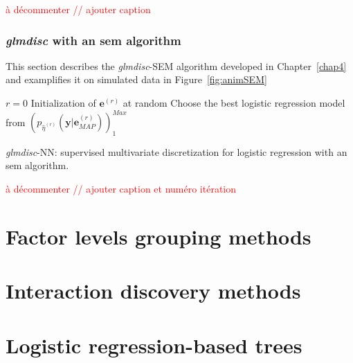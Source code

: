 \textcolor{red}{à décommenter // ajouter caption}

\subsubsection{\textit{glmdisc} with an \gls{sem} algorithm}

This section describes the \textit{glmdisc}-SEM algorithm developed in Chapter~\ref{chap4} and examplifies it on simulated data in Figure~\ref{fig:animSEM}

\begin{algorithm}[H]
 $r = 0$\;
 Initialization of $\bm{e}^{(r)}$ at random\;
 Choose the best logistic regression model from $(p_{\hat{\eta}^{(r)}}(\bm{y} | \bm{e}_{MAP}^{(r)}))_1^{Max}$\;
 \caption{\label{SEM-disc} \textit{glmdisc}-NN: supervised multivariate discretization for logistic regression with an \gls{sem} algorithm.}
\end{algorithm}


\textcolor{red}{à décommenter // ajouter caption  et numéro itération}


\section{Factor levels grouping methods}


\section{Interaction discovery methods}


\section{Logistic regression-based trees}


\printbibliography[heading=subbibliography, title=References of Appendix A]